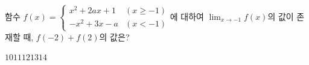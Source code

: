 함수 $f(x)=\begin{cases} x^2+2ax+1 & (x\ge -1) \\ -x^2+3x-a & (x<-1) \end{cases}$에 대하여 $\displaystyle\lim_{x\to -1} f(x)$의 값이 존재할 때, $f(-2)+f(2)$의 값은? 
\begin{choices32}{$10$}{$11$}{$12$}{$13$}{$14$}\end{choices32}
